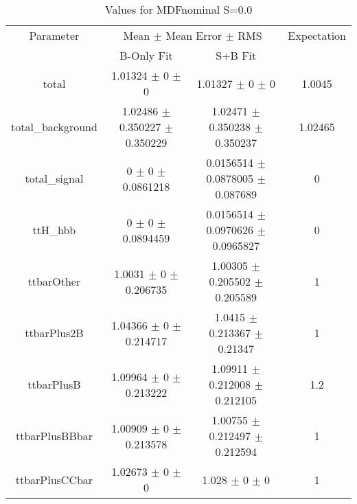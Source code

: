 \begin{table}
\centering
\caption{Values for MDFnominal S=0.0}
\begin{tabular}{cccc}
\toprule
Parameter & \multicolumn{2}{c}{Mean $\pm$ Mean Error $\pm$ RMS} & Expectation\\
 & B-Only Fit & S+B Fit & \\
\midrule
total & \num{1.01324} $\pm$ \num{0} $\pm$ \num{0} & \num{1.01327} $\pm$ \num{0} $\pm$ \num{0} & \num{1.0045}\\
total\_background & \num{1.02486} $\pm$ \num{0.350227} $\pm$ \num{0.350229} & \num{1.02471} $\pm$ \num{0.350238} $\pm$ \num{0.350237} & \num{1.02465}\\
total\_signal & \num{0} $\pm$ \num{0} $\pm$ \num{0.0861218} & \num{0.0156514} $\pm$ \num{0.0878005} $\pm$ \num{0.087689} & \num{0}\\
ttH\_hbb & \num{0} $\pm$ \num{0} $\pm$ \num{0.0894459} & \num{0.0156514} $\pm$ \num{0.0970626} $\pm$ \num{0.0965827} & \num{0}\\
ttbarOther & \num{1.0031} $\pm$ \num{0} $\pm$ \num{0.206735} & \num{1.00305} $\pm$ \num{0.205502} $\pm$ \num{0.205589} & \num{1}\\
ttbarPlus2B & \num{1.04366} $\pm$ \num{0} $\pm$ \num{0.214717} & \num{1.0415} $\pm$ \num{0.213367} $\pm$ \num{0.21347} & \num{1}\\
ttbarPlusB & \num{1.09964} $\pm$ \num{0} $\pm$ \num{0.213222} & \num{1.09911} $\pm$ \num{0.212008} $\pm$ \num{0.212105} & \num{1.2}\\
ttbarPlusBBbar & \num{1.00909} $\pm$ \num{0} $\pm$ \num{0.213578} & \num{1.00755} $\pm$ \num{0.212497} $\pm$ \num{0.212594} & \num{1}\\
ttbarPlusCCbar & \num{1.02673} $\pm$ \num{0} $\pm$ \num{0} & \num{1.028} $\pm$ \num{0} $\pm$ \num{0} & \num{1}\\
\bottomrule
\end{tabular}
\end{table}
